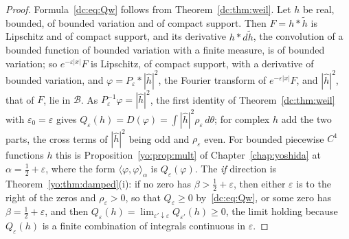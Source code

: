 \begin{proof}
Formula~\eqref{dc:eq:Qw} follows from Theorem~\ref{dc:thm:weil}. Let $h$ be real, bounded, of bounded variation and of compact support. Then $F=h*\tilde h$ is Lipschitz and of compact support, and its derivative $h*d\tilde h$, the convolution of a bounded function of bounded variation with a finite measure, is of bounded variation; so $e^{-\varepsilon|x|}F$ is Lipschitz, of compact support, with a derivative of bounded variation, and $\varphi=P_\varepsilon*|\hat h|^2$, the Fourier transform of $e^{-\varepsilon|x|}F$, and $|\hat h|^2$, that of $F$, lie in $\mathcal B$. As $P_\varepsilon^{-1}\varphi=|\hat h|^2$, the first identity of Theorem~\ref{dc:thm:weil} with $\varepsilon_0=\varepsilon$ gives $Q_\varepsilon(h)=D(\varphi)=\int|\hat h|^2\rho_\varepsilon\,d\theta$; for complex $h$ add the two parts, the cross terms of $|\hat h|^2$ being odd and $\rho_\varepsilon$ even. For bounded piecewise $C^1$ functions $h$ this is Proposition~\ref{yo:prop:mult} of Chapter~\ref{chap:yoshida} at $\alpha=\frac12+\varepsilon$, where the form $\langle\varphi,\varphi\rangle_\alpha$ is $Q_\varepsilon(\varphi)$. The \emph{if} direction is Theorem~\ref{yo:thm:damped}(i): if no zero has $\beta>\frac12+\varepsilon$, then either $\varepsilon$ is to the right of the zeros and $\rho_\varepsilon>0$, so that $Q_\varepsilon\ge0$ by~\eqref{dc:eq:Qw}, or some zero has $\beta=\frac12+\varepsilon$, and then $Q_\varepsilon(h)=\lim_{\varepsilon'\downarrow\varepsilon}Q_{\varepsilon'}(h)\ge0$, the limit holding because $Q_\varepsilon(h)$ is a finite combination of integrals continuous in $\varepsilon$.


\end{proof}
